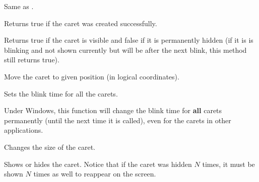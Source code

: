 
Same as .

\label{wxcaretisok}


Returns true if the caret was created successfully.

\label{wxcaretisvisible}


Returns true if the caret is visible and false if it is permanently
hidden (if it is is blinking and not shown currently but will be after the
next blink, this method still returns true).

\label{wxcaretmove}



Move the caret to given position (in logical coordinates).

\label{wxcaretsetblinktime}


Sets the blink time for all the carets.


Under Windows, this function will change the blink time for {\bf all} carets
permanently (until the next time it is called), even for the carets in other
applications.



\label{wxcaretsetsize}



Changes the size of the caret.

\label{wxcaretshow}


Shows or hides the caret. Notice that if the caret was hidden $N$ times, it
must be shown $N$ times as well to reappear on the screen.

